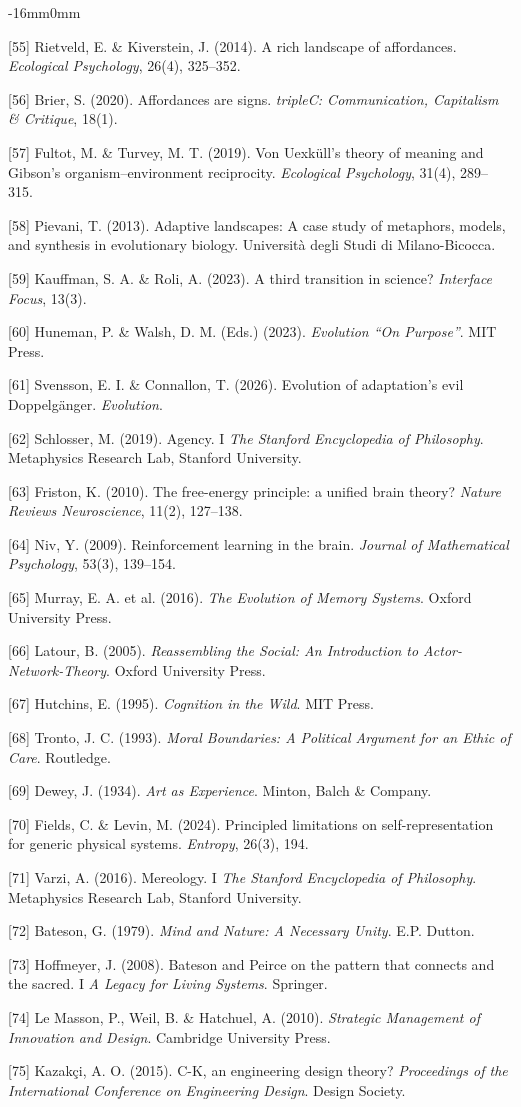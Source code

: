 \documentclass[10pt,oneside]{book}
\newcommand{\refentry}[1]{%
  \par\addvspace{0pt}%
  \begingroup\footnotesize\linespread{0.92}\selectfont
  \noindent\hangindent=4mm\hangafter=1 #1\par%
  \endgroup
}
\newenvironment{widebody}{%
  \begin{adjustwidth}{-16mm}{0mm}%
}{%
  \end{adjustwidth}%
}
\begin{document}
\begin{widebody}
\refentry{[55] Rietveld, E. \& Kiverstein, J. (2014). A rich landscape of affordances. \textit{Ecological Psychology}, 26(4), 325--352.}
\refentry{[56] Brier, S. (2020). Affordances are signs. \textit{tripleC: Communication, Capitalism \& Critique}, 18(1).}
\refentry{[57] Fultot, M. \& Turvey, M. T. (2019). Von Uexküll's theory of meaning and Gibson's organism--environment reciprocity. \textit{Ecological Psychology}, 31(4), 289--315.}
\refentry{[58] Pievani, T. (2013). Adaptive landscapes: A case study of metaphors, models, and synthesis in evolutionary biology. Università degli Studi di Milano-Bicocca.}
\refentry{[59] Kauffman, S. A. \& Roli, A. (2023). A third transition in science? \textit{Interface Focus}, 13(3).}
\refentry{[60] Huneman, P. \& Walsh, D. M. (Eds.) (2023). \textit{Evolution ``On Purpose''}. MIT Press.}
\refentry{[61] Svensson, E. I. \& Connallon, T. (2026). Evolution of adaptation's evil Doppelgänger. \textit{Evolution}.}
\refentry{[62] Schlosser, M. (2019). Agency. I \textit{The Stanford Encyclopedia of Philosophy}. Metaphysics Research Lab, Stanford University.}
\refentry{[63] Friston, K. (2010). The free-energy principle: a unified brain theory? \textit{Nature Reviews Neuroscience}, 11(2), 127--138.}
\refentry{[64] Niv, Y. (2009). Reinforcement learning in the brain. \textit{Journal of Mathematical Psychology}, 53(3), 139--154.}
\refentry{[65] Murray, E. A. et al. (2016). \textit{The Evolution of Memory Systems}. Oxford University Press.}
\refentry{[66] Latour, B. (2005). \textit{Reassembling the Social: An Introduction to Actor-Network-Theory}. Oxford University Press.}
\refentry{[67] Hutchins, E. (1995). \textit{Cognition in the Wild}. MIT Press.}
\refentry{[68] Tronto, J. C. (1993). \textit{Moral Boundaries: A Political Argument for an Ethic of Care}. Routledge.}
\refentry{[69] Dewey, J. (1934). \textit{Art as Experience}. Minton, Balch \& Company.}
\refentry{[70] Fields, C. \& Levin, M. (2024). Principled limitations on self-representation for generic physical systems. \textit{Entropy}, 26(3), 194.}
\refentry{[71] Varzi, A. (2016). Mereology. I \textit{The Stanford Encyclopedia of Philosophy}. Metaphysics Research Lab, Stanford University.}
\refentry{[72] Bateson, G. (1979). \textit{Mind and Nature: A Necessary Unity}. E.P. Dutton.}
\refentry{[73] Hoffmeyer, J. (2008). Bateson and Peirce on the pattern that connects and the sacred. I \textit{A Legacy for Living Systems}. Springer.}
\refentry{[74] Le Masson, P., Weil, B. \& Hatchuel, A. (2010). \textit{Strategic Management of Innovation and Design}. Cambridge University Press.}
\refentry{[75] Kazakçi, A. O. (2015). C-K, an engineering design theory? \textit{Proceedings of the International Conference on Engineering Design}. Design Society.}

\end{widebody}
\end{document}
